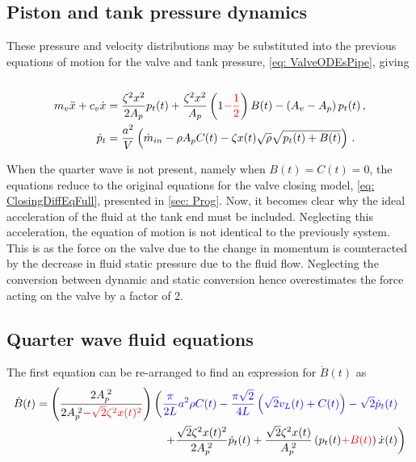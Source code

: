 \subsection{Piston and tank pressure dynamics}

These pressure and velocity distributions may be substituted into the previous equations of motion for the valve and tank pressure, \cref{eq: ValveODEsPipe}, giving
~
\begin{equation*}
\begin{split}
    m_v \ddot{x} + c_v \dot{x} &= \frac{\zeta^2 x^2}{2 A_p} p_t(t) + \frac{\zeta^2 x^2}{A_p} \left( 1 \textcolor{Red}{- \frac{1}{2}} \right) B(t) - \left( A_v - A_p \right) p_t(t)
    \, , \\
    \dot{p}_t &= \frac{a^2}{V} \left( \dot{m}_{in} - \rho A_p C(t) - \zeta x(t) \sqrt{\rho} \sqrt{p_t(t) + B(t)} \right) \, .
\end{split}
\end{equation*}

When the quarter wave is not present, namely when $B(t) = C(t) = 0$, the equations reduce to the original equations for the valve closing model, \cref{eq: ClosingDiffEqFull}, presented in \cref{sec: Prog}. Now, it becomes clear why the ideal acceleration of the fluid at the tank end must be included. Neglecting this acceleration, the equation of motion is not identical to the previously system. This is as the force on the valve due to the change in momentum is counteracted by the decrease in fluid static pressure due to the fluid flow. Neglecting the conversion between dynamic and static conversion hence overestimates the force acting on the valve by a factor of 2.

\subsection{Quarter wave fluid equations} 

The first equation can be re-arranged to find an expression for $\dot{B}(t)$ as
~
\begin{equation}  \label{eq: QWMFullDiffB}
\begin{split}
    \dot{B}(t) = \left( \frac{2 A_p\power{2}}{2 A_p\power{2} \textcolor{Red}{- \sqrt{2} \zeta^2 x(t)^2}} \right)
    &\left( \textcolor{Blue}{
    \frac{\pi}{2L} a^2 \rho C(t) - \frac{\pi \sqrt{2}}{4L} \left( \sqrt{2} v_L(t) + C(t) \right) - \sqrt{2} \dot{p}_t(t)}
     \right.  \\ & \quad \left.  %
    + \frac{\sqrt{2} \zeta^2 x(t)^2}{2 A_p\power{2}} \dot{p}_t(t) + \frac{\sqrt{2} \zeta^2 x(t)}{A_p\power{2}} \left( p_t(t) \textcolor{Red}{+ B(t)} \right) \dot{x}(t)
    \right)
\end{split}
\end{equation}

